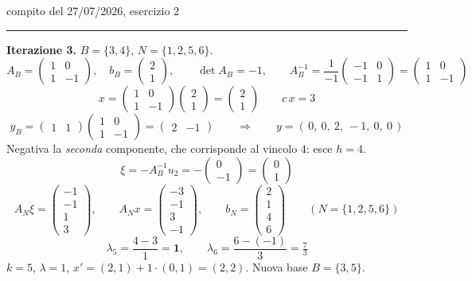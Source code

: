 \documentclass[11pt,a4paper]{article}
\begin{document}
\begin{es}{compito del 27/07/2026, esercizio 2}
\medskip
\hrule
\medskip

\textbf{Iterazione 3.} \quad $B=\{3,4\}$, $N=\{1,2,5,6\}$.
\[
A_B = \begin{pmatrix}1 & 0\\ 1 & -1\end{pmatrix},\quad
b_B = \begin{pmatrix}2\\1\end{pmatrix},
\qquad \det A_B = -1,
\qquad
A_B^{-1} = \frac{1}{-1}\begin{pmatrix}-1 & 0\\ -1 & 1\end{pmatrix}
= \begin{pmatrix}1 & 0\\ 1 & -1\end{pmatrix}
\]
\[
x = \begin{pmatrix}1&0\\1&-1\end{pmatrix}\begin{pmatrix}2\\1\end{pmatrix} = \begin{pmatrix}2\\1\end{pmatrix}
\qquad c\,x = 3
\]
\[
y_B = \begin{pmatrix}1&1\end{pmatrix}\begin{pmatrix}1&0\\1&-1\end{pmatrix} = \begin{pmatrix}2 & -1\end{pmatrix}
\qquad\Longrightarrow\qquad y = (\,0,\ 0,\ 2,\ -1,\ 0,\ 0\,)
\]
Negativa la \emph{seconda} componente, che corrisponde al vincolo $4$: esce $h = 4$.
\[
\xi = -A_B^{-1}u_2 = -\begin{pmatrix}0\\-1\end{pmatrix} = \begin{pmatrix}0\\1\end{pmatrix}
\]
\[
A_N\xi = \begin{pmatrix}-1\\-1\\1\\3\end{pmatrix},\qquad
A_N x = \begin{pmatrix}-3\\-1\\3\\-1\end{pmatrix},\qquad
b_N = \begin{pmatrix}2\\1\\4\\6\end{pmatrix}
\qquad (N=\{1,2,5,6\})
\]
\[
\lambda_5 = \frac{4-3}{1} = \mathbf{1},\qquad
\lambda_6 = \frac{6-(-1)}{3} = \tfrac{7}{3}
\]
$k = 5$, $\lambda = 1$, $x' = (2,1) + 1\cdot(0,1) = (2,2)$. Nuova base $B = \{3,5\}$.


\end{es}
\end{document}
